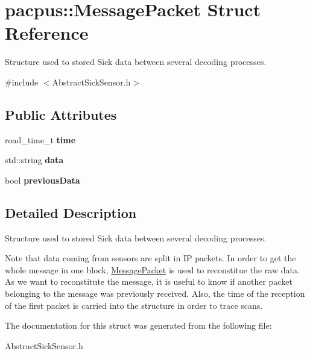 \hypertarget{structpacpus_1_1MessagePacket}{\section{pacpus\-:\-:Message\-Packet Struct Reference}
\label{structpacpus_1_1MessagePacket}
}


Structure used to stored Sick data between several decoding processes.  




{\ttfamily \#include $<$Abstract\-Sick\-Sensor.\-h$>$}

\subsection*{Public Attributes}
\begin{DoxyCompactItemize}
\item 
\hypertarget{structpacpus_1_1MessagePacket_a8662b64b5eba2ca27aeba340e79a47c9}{road\-\_\-time\-\_\-t {\bfseries time}}\label{structpacpus_1_1MessagePacket_a8662b64b5eba2ca27aeba340e79a47c9}

\item 
\hypertarget{structpacpus_1_1MessagePacket_afcacd2d4d236410ad9352050e42346e7}{std\-::string {\bfseries data}}\label{structpacpus_1_1MessagePacket_afcacd2d4d236410ad9352050e42346e7}

\item 
\hypertarget{structpacpus_1_1MessagePacket_afd653684969f8d6f68564559d82b7241}{bool {\bfseries previous\-Data}}\label{structpacpus_1_1MessagePacket_afd653684969f8d6f68564559d82b7241}

\end{DoxyCompactItemize}


\subsection{Detailed Description}
Structure used to stored Sick data between several decoding processes. 

Note that data coming from sensors are split in I\-P packets. In order to get the whole message in one block, \hyperlink{structpacpus_1_1MessagePacket}{Message\-Packet} is used to reconstitue the raw data. As we want to reconstitute the message, it is useful to know if another packet belonging to the message was previously received. Also, the time of the reception of the first packet is carried into the structure in order to trace scans. 

The documentation for this struct was generated from the following file\-:\begin{DoxyCompactItemize}
\item 
Abstract\-Sick\-Sensor.\-h\end{DoxyCompactItemize}
